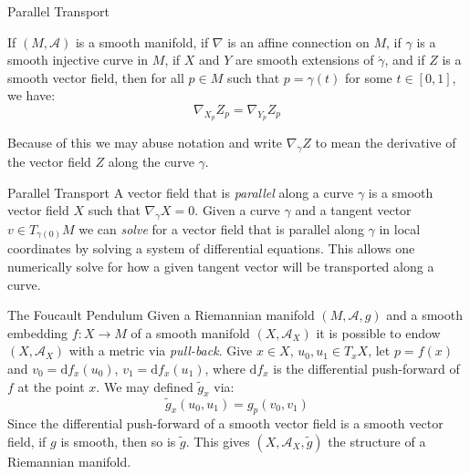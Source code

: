 \documentclass{beamer}
\begin{document}
    \begin{frame}{Parallel Transport}
        \begin{theorem}
            If $(M,\mathcal{A})$ is a smooth manifold, if $\nabla$ is an affine
            connection on $M$, if $\gamma$ is a smooth injective curve in $M$,
            if $X$ and $Y$ are smooth extensions of $\dot{\gamma}$, and if $Z$
            is a smooth vector field, then for all $p\in{M}$ such that
            $p=\gamma(t)$ for some $t\in[0,1]$, we have:
            \begin{equation}
                \nabla_{X_{p}}Z_{p}=\nabla_{Y_{p}}Z_{p}
            \end{equation}
        \end{theorem}
        Because of this we may abuse notation and write
        $\nabla_{\dot{\gamma}}Z$ to mean the derivative of the vector field $Z$
        along the curve $\gamma$.
    \end{frame}
    \begin{frame}{Parallel Transport}
        A vector field that is \textit{parallel} along a curve $\gamma$ is a
        smooth vector field $X$ such that $\nabla_{\dot{\gamma}}X=0$. Given a
        curve $\gamma$ and a tangent vector $v\in{T}_{\gamma(0)}M$ we can
        \textit{solve} for a vector field that is parallel along $\gamma$ in
        local coordinates by solving a system of differential equations. This
        allows one numerically solve for how a given tangent vector will be
        transported along a curve.
    \end{frame}
    \begin{frame}{The Foucault Pendulum}
        Given a Riemannian manifold $(M,\mathcal{A},g)$ and a smooth embedding
        $f:X\rightarrow{M}$ of a smooth manifold $(X,\mathcal{A}_{X})$ it is
        possible to endow $(X,\mathcal{A}_{X})$ with a metric via
        \textit{pull-back}. Give $x\in{X}$, $u_{0},u_{1}\in{T}_{x}X$, let
        $p=f(x)$ and $v_{0}=\textrm{d}f_{x}(u_{0})$,
        $v_{1}=\textrm{d}f_{x}(u_{1})$, where $\textrm{d}f_{x}$ is the
        differential push-forward of $f$ at the point $x$. We may defined
        $\tilde{g}_{x}$ via:
        \begin{equation}
            \tilde{g}_{x}(u_{0},u_{1})=g_{p}(v_{0},v_{1})
        \end{equation}
        Since the differential push-forward of a smooth vector field is a
        smooth vector field, if $g$ is smooth, then so is $\tilde{g}$. This
        gives $(X,\mathcal{A}_{X},\tilde{g})$ the structure of a Riemannian
        manifold.
    \end{frame}
\end{document}
